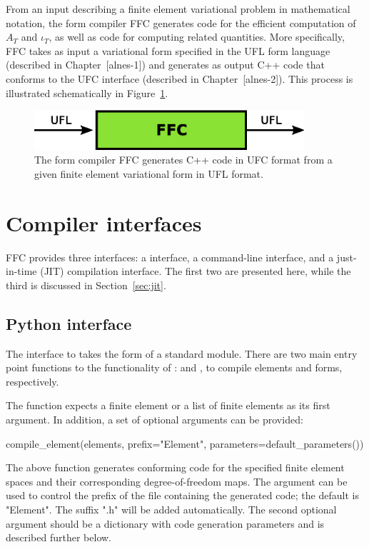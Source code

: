 From an input describing a finite element variational problem in
mathematical notation, the form compiler FFC generates code for the
efficient computation of $A_T$ and $\iota_T$, as well as code for
computing related quantities. More specifically, FFC takes as input a
variational form specified in the UFL form language (described in
Chapter~[alnes-1]) and generates as output C++ code that conforms to
the UFC interface (described in Chapter~[alnes-2]). This process is
illustrated schematically in Figure~\ref{fig:formcompiler}.

\begin{figure}
  \begin{center}
    \includegraphics[width=10cm]{chapters/logg-1/eps/ufl_ffc_ufc.eps}
    \caption{The form compiler FFC generates C++ code in UFC format
      from a given finite element variational form in UFL format.}
    \label{fig:formcompiler}
  \end{center}
\end{figure}

\section{Compiler interfaces}

FFC provides three interfaces: a \pythonlang{} interface, a
command-line interface, and a just-in-time (JIT) compilation
interface. The first two are presented here, while the third is
discussed in Section~\ref{sec:jit}.

\subsection{Python interface}

The \pythonlang{} interface to \ffc{} takes the form of a standard
\pythonlang{} module. There are two main entry point functions to the
functionality of \ffc{}:  and
, to compile elements and forms, respectively.

The  function expects a finite element or a
list of finite elements as its first argument. In addition, a set of
optional arguments can be provided:
%
\begin{python}
compile_element(elements,
                prefix="Element",
                parameters=default_parameters())
\end{python}
%
The above function generates \ufc{} conforming code for the specified
finite element spaces and their corresponding degree-of-freedom maps. The
 argument can be used to control the prefix of the
file containing the generated code; the default is "Element". The
suffix ".h" will be added automatically. The second optional argument
 should be a \pythonlang{} dictionary with code
generation parameters and is described further below.

